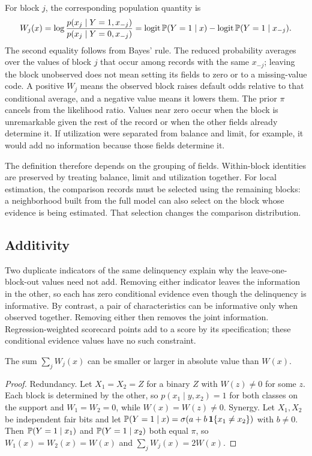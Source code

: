 For block $j$, the corresponding population quantity is
\begin{equation}\label{eq:cwoe}
W_j(x)=\log\frac{p(x_j\mid Y=1,x_{-j})}{p(x_j\mid Y=0,x_{-j})}=\operatorname{logit}\mathbb P(Y=1\mid x)-\operatorname{logit}\mathbb P(Y=1\mid x_{-j}).
\end{equation}
The second equality follows from Bayes' rule. The reduced probability averages over the values of block $j$ that occur among records with the same $x_{-j}$; leaving the block unobserved does not mean setting its fields to zero or to a missing-value code. A positive $W_j$ means the observed block raises default odds relative to that conditional average, and a negative value means it lowers them. The prior $\pi$ cancels from the likelihood ratio. Values near zero occur when the block is unremarkable given the rest of the record or when the other fields already determine it. If utilization were separated from balance and limit, for example, it would add no information because those fields determine it.

The definition therefore depends on the grouping of fields. Within-block identities are preserved by treating balance, limit and utilization together. For local estimation, the comparison records must be selected using the remaining blocks: a neighborhood built from the full model can also select on the block whose evidence is being estimated. That selection changes the comparison distribution.

\subsection{Additivity}

Two duplicate indicators of the same delinquency explain why the leave-one-block-out values need not add. Removing either indicator leaves the information in the other, so each has zero conditional evidence even though the delinquency is informative. By contrast, a pair of characteristics can be informative only when observed together. Removing either then removes the joint information. Regression-weighted scorecard points add to a score by its specification; these conditional evidence values have no such constraint.

\begin{proposition}\label{prop:nonadd}
The sum $\sum_jW_j(x)$ can be smaller or larger in absolute value than $W(x)$.
\end{proposition}
\begin{proof}
Redundancy. Let $X_1=X_2=Z$ for a binary $Z$ with $W(z)\neq0$ for some $z$. Each block is determined by the other, so $p(x_1\mid y,x_2)=1$ for both classes on the support and $W_1=W_2=0$, while $W(x)=W(z)\neq0$.
Synergy. Let $X_1,X_2$ be independent fair bits and let $\mathbb P(Y=1\mid x)=\sigma(a+b\,\mathbf 1\{x_1\neq x_2\})$ with $b\neq0$. Then $\mathbb P(Y=1\mid x_1)$ and $\mathbb P(Y=1\mid x_2)$ both equal $\pi$, so $W_1(x)=W_2(x)=W(x)$ and $\sum_jW_j(x)=2W(x)$.
\end{proof}

